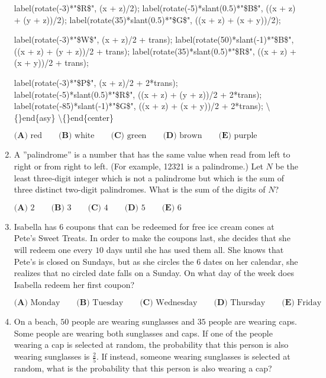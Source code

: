 \documentclass{article}
\begin{document}
\begin{enumerate}[label=\arabic*., itemsep=0.5em]
label(rotate(-3)*"\$R\$", (x + z)/2);
label(rotate(-5)*slant(0.5)*"\$B\$", ((x + z) + (y + z))/2);
label(rotate(35)*slant(0.5)*"\$G\$", ((x + z) + (x + y))/2);

label(rotate(-3)*"\$W\$", (x + z)/2 + trans);
label(rotate(50)*slant(-1)*"\$B\$", ((x + z) + (y + z))/2 + trans);
label(rotate(35)*slant(0.5)*"\$R\$", ((x + z) + (x + y))/2 + trans);

label(rotate(-3)*"\$P\$", (x + z)/2 + 2*trans);
label(rotate(-5)*slant(0.5)*"\$R\$", ((x + z) + (y + z))/2 + 2*trans);
label(rotate(-85)*slant(-1)*"\$G\$", ((x + z) + (x + y))/2 + 2*trans);
\textbackslash\{\}end\{asy\}
\textbackslash\{\}end\{center\}


\(\textbf{(A) }\text{red}\qquad\textbf{(B) }\text{white}\qquad\textbf{(C) }\text{green}\qquad\textbf{(D) }\text{brown}\qquad\textbf{(E) }\text{purple}\)\par \vspace{0.5em}\item A ''palindrome'' is a number that has the same value when read from left to right or from right to left. (For example, 12321 is a palindrome.) Let \(N\) be the least three-digit integer which is not a palindrome but which is the sum of three distinct two-digit palindromes. What is the sum of the digits of \(N\)?

\(\textbf{(A) }2\qquad\textbf{(B) }3\qquad\textbf{(C) }4\qquad\textbf{(D) }5\qquad\textbf{(E) }6\)\par \vspace{0.5em}\item Isabella has \(6\) coupons that can be redeemed for free ice cream cones at Pete's Sweet Treats. In order to make the coupons last, she decides that she will redeem one every \(10\) days until she has used them all. She knows that Pete's is closed on Sundays, but as she circles the \(6\) dates on her calendar, she realizes that no circled date falls on a Sunday. On what day of the week does Isabella redeem her first coupon?

\(\textbf{(A) }\text{Monday}\qquad\textbf{(B) }\text{Tuesday}\qquad\textbf{(C) }\text{Wednesday}\qquad\textbf{(D) }\text{Thursday}\qquad\textbf{(E) }\text{Friday}\)\par \vspace{0.5em}\item On a beach, \(50\) people are wearing sunglasses and \(35\) people are wearing caps. Some people are wearing both sunglasses and caps. If one of the people wearing a cap is selected at random, the probability that this person is also wearing sunglasses is \(\frac{2}{5}\). If instead, someone wearing sunglasses is selected at random, what is the probability that this person is also wearing a cap?


\end{enumerate}
\end{document}
